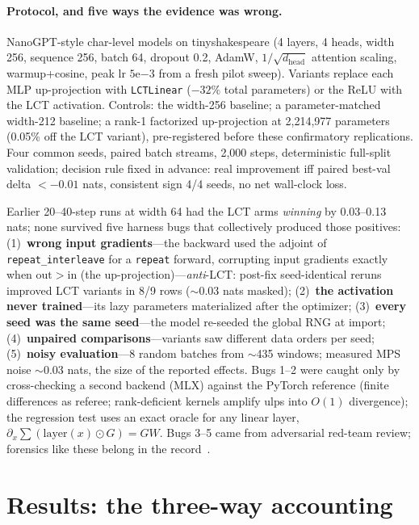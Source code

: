 \documentclass{article}
\begin{document}
\paragraph{Protocol, and five ways the evidence was wrong.} NanoGPT-style char-level models on tinyshakespeare (4 layers, 4 heads, width 256, sequence 256,
batch 64, dropout 0.2, AdamW, $1/\sqrt{d_{\mathrm{head}}}$ attention scaling, warmup+cosine, peak
lr $5\mathrm{e}{-3}$ from a fresh pilot sweep). Variants replace each MLP up-projection with
\texttt{LCTLinear} ($-32\%$ total parameters) or the ReLU with the LCT activation. Controls:
the width-256 baseline; a parameter-matched width-212 baseline; a rank-1 factorized up-projection
at 2{,}214{,}977 parameters (0.05\% off the LCT variant), pre-registered before these confirmatory
replications. Four common seeds, paired batch streams, 2{,}000 steps, deterministic full-split
validation; decision rule fixed in advance: real improvement iff paired best-val delta
$< -0.01$ nats, consistent sign 4/4 seeds, no net wall-clock loss.

Earlier 20--40-step runs at width 64 had the LCT arms \emph{winning} by 0.03--0.13 nats; none
survived five harness bugs that collectively produced those positives: (1)~\textbf{wrong input
gradients}---the backward used the adjoint of \texttt{repeat\_interleave} for a \texttt{repeat}
forward, corrupting input gradients exactly when $\mathrm{out} > \mathrm{in}$ (the
up-projection)---\emph{anti}-LCT: post-fix seed-identical reruns improved LCT variants in 8/9
rows ($\sim$0.03 nats masked); (2)~\textbf{the activation never trained}---its lazy
parameters materialized after the optimizer; (3)~\textbf{every seed was the same
seed}---the model re-seeded the global RNG at import; (4)~\textbf{unpaired
comparisons}---variants saw different data orders per seed; (5)~\textbf{noisy
evaluation}---8 random batches from $\sim$435 windows; measured MPS noise $\sim$0.03 nats, the
size of the reported effects. Bugs 1--2 were caught only by cross-checking a
second backend (MLX) against the PyTorch reference (finite differences as referee; rank-deficient
kernels amplify ulps into $O(1)$ divergence); the regression test uses an exact oracle for any
linear layer, $\partial_x \sum(\mathrm{layer}(x)\odot G) = GW$. Bugs 3--5 came from adversarial
red-team review; forensics like these belong in the record~\cite{lucic2018gans,melis2018}.

\section{Results: the three-way accounting}
\label{sec:results}
\end{document}
